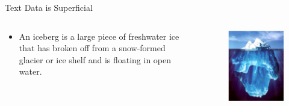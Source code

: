 \begin{frame}[allowframebreaks]{Text Data is Superficial}
    \large
    \begin{columns}
        \begin{column}{0.5\textwidth}
            \begin{itemize}
                \item An iceberg is a large piece of freshwater ice that has broken off from a snow-formed glacier or ice shelf and is floating in open water.
            \end{itemize}
        \end{column}
        \begin{column}{0.5\textwidth}
            \begin{figure}
                \centering
                \includegraphics[width=\textwidth,height=0.9\textheight,keepaspectratio]{images/nlp-intro/iceberg-2.png}
            \end{figure}
        \end{column}
    \end{columns}
\end{frame}    

